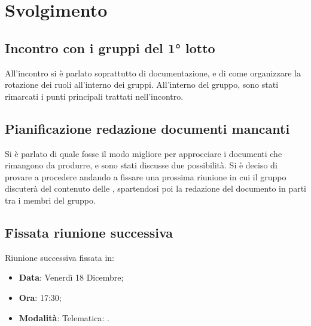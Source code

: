 \documentclass[]{article}
\begin{document}
	\newpage

	\section{Svolgimento}
		\subsection{Incontro con i gruppi del 1° lotto}
		All'incontro si è parlato soprattutto di documentazione, e di come organizzare la rotazione dei ruoli all'interno dei gruppi. All'interno del gruppo, sono stati rimarcati i punti principali trattati nell'incontro.\\

		\subsection{Pianificazione redazione documenti mancanti}
		Si è parlato di quale fosse il modo migliore per approcciare i documenti che rimangono da produrre, e sono stati discusse due possibilità.
		Si è deciso di provare a procedere andando a fissare una prossima riunione in cui il gruppo discuterà del contenuto delle , spartendosi poi la redazione del documento in parti tra i membri del gruppo.\\

		\subsection{Fissata riunione successiva}
		Riunione successiva fissata in:
		\begin{itemize}
			\item \textbf{Data}: Venerdì 18 Dicembre;
			\item \textbf{Ora}: 17:30;
			\item \textbf{Modalità}: Telematica: .
		\end{itemize}
\end{document}
